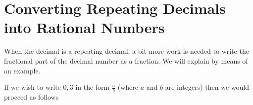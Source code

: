     \section{ Converting Repeating Decimals into Rational Numbers}
            \nopagebreak
      \label{m38348*id63993}When the decimal is a repeating decimal, a bit more work is needed to write the fractional part of the decimal number as a fraction. We will explain by means of an example.\par 
      \label{m38348*id63998}If we wish to write $0,\dot{3}$ in the form $\frac{a}{b}$ (where $a$ and $b$ are integers) then we would proceed as follows
\par 
      \label{m38348*uid21}\nopagebreak\noindent{}
